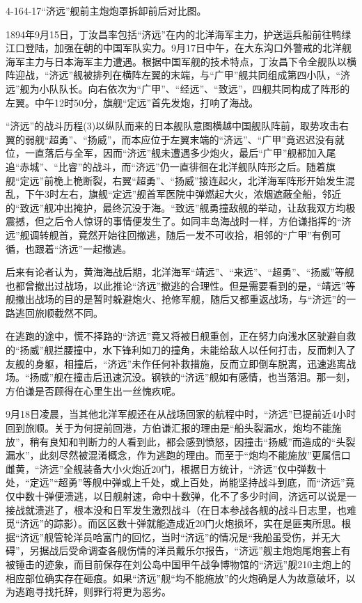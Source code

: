 \documentclass[12pt,UTF8]{ctexbook}
\begin{document}
4-164-17“济远”舰前主炮炮罩拆卸前后对比图。

1894年9月15日，丁汝昌率包括“济远”在内的北洋海军主力，护送运兵船前往鸭绿江口登陆，加强在朝的中国军队实力。9月17日中午，在大东沟口外警戒的北洋舰海军主力与日本海军主力遭遇。根据中国军舰的技术特点，丁汝昌下令全舰队以横阵迎战，“济远”舰被排列在横阵左翼的末端，与“广甲”舰共同组成第四小队，“济远”舰为小队队长。向右依次为“广甲”、“经远”、“致远”，四舰共同构成了阵形的左翼。中午12时50分，旗舰“定远”首先发炮，打响了海战。

“济远”的战斗历程(3)以纵队而来的日本舰队意图横越中国舰队阵前，取势攻击右翼的弱舰“超勇”、“扬威”，而本应位于左翼末端的“济远”、“广甲”竟迟迟没有就位，一直落后与全军，因而“济远”舰未遭遇多少炮火，最后“广甲”舰都加入尾追“赤城”、“比睿”的战斗，而“济远”仍一直徘徊在北洋舰队阵形之后。随着旗舰“定远”前桅上桅断裂，右翼“超勇”、“扬威”接连起火，北洋海军阵形开始发生混乱，下午3时左右，旗舰“定远”舰首军医院中弹燃起大火，浓烟遮蔽全船，邻近的“致远”舰冲出掩护，最终沉没于海。“致远”舰勇撞敌舰的举动，让敌我双方均极震撼，但之后令人惊讶的事情便发生了。如同丰岛海战时一样，方伯谦指挥的“济远”舰调转舰首，竟然开始往回撤逃，随后一发不可收拾，相邻的“广甲”有例可循，也跟着“济远”一起撤逃。

后来有论者认为，黄海海战后期，北洋海军“靖远”、“来远”、“超勇”、“扬威”等舰也都曾撤出过战场，以此推论“济远”撤逃的合理性。但是需要看到的是，“靖远”等舰撤出战场的目的是暂时躲避炮火、抢修军舰，随后又都重返战场，与“济远”的一路逃回旅顺截然不同。

在逃跑的途中，慌不择路的“济远”竟又将被日舰重创，正在努力向浅水区驶避自救的“扬威”舰拦腰撞中，水下锋利如刀的撞角，未能给敌人以任何打击，反而刺入了友舰的身躯，相撞后，“济远”未作任何补救措施，反而立即倒车脱离，迅速逃离战场。“扬威”舰在撞击后迅速沉没。钢铁的“济远”舰如有感情，也当落泪。那一刻，方伯谦是否顾得在心里生出一丝愧疚呢。

9月18日凌晨，当其他北洋军舰还在从战场回家的航程中时，“济远”已提前近4小时回到旅顺。关于为何提前回港，方伯谦汇报的理由是“船头裂漏水，炮均不能施放”，稍有良知和判断力的人看到此，都会感到愤怒，因撞击“扬威”而造成的“头裂漏水”，此刻尽然被混淆概念，作为逃跑的理由。而至于“炮均不能施放”更属信口雌黄，“济远”全舰装备大小火炮近20门，根据日方统计，“济远”仅中弹数十处，“定远”“超勇”等舰中弹或上千处，或上百处，尚能坚持战斗到底，而“济远”竟仅中数十弹便溃逃，以日舰射速，命中十数弹，化不了多少时间，济远可以说是一接战就溃逃了，根本没和日军发生激烈战斗（在日本参战各舰的战斗日志里，也难觅“济远”的踪影）。而区区数十弹就能造成近20门火炮损坏，实在是匪夷所思。根据“济远”舰管轮洋员哈富门的回忆，当时“济远”的情况是“我船虽受伤，并无大碍”，另据战后受命调查各舰伤情的洋员戴乐尔报告，“济远”舰主炮炮尾炮套上有被锤击的迹象，而目前保存在刘公岛中国甲午战争博物馆的“济远”舰210主炮上的相应部位确实存在砸痕。如果“济远”舰“均不能施放”的火炮确是人为故意破坏，以为逃跑寻找托辞，则罪行将更为恶劣。
\end{document}
